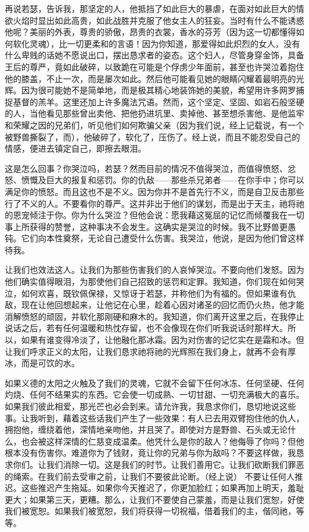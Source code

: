 再说若瑟，告诉我，那坚定的人，他抵挡了如此巨大的暴虐，在面对如此巨大的情欲火焰时显出如此高贵，如此战胜并克服了他女主人的狂妄。当时有什么不能诱惑他呢？美丽的外表，尊贵的骄傲，昂贵的衣裳，香水的芬芳（因为这一切都懂得如何软化灵魂），比一切更柔和的言语！因为你知道，那爱得如此炽烈的女人，没有什么卑贱的话她不愿说出口，摆出恳求者的姿态。这个妇人，尽管身穿金饰，具备王后的尊严，竟如此破碎，以致跪在可能是个俘虏少年面前，甚至也许哭泣着抱住他的膝盖，不止一次，而是屡次如此。然后他可能看见她的眼睛闪耀着最明亮的光辉。因为很可能她不是简单地，而是极其精心地装饰她的美貌，希望用许多网罗捕捉基督的羔羊。这里还加上许多魔法咒语。然而，这个坚定、坚固、如岩石般坚硬的人，当他看见那些曾出卖他、把他扔进坑里、卖掉他、甚至想杀害他、是他监牢和荣耀之因的兄弟们，听见他们如何欺骗父亲（因为我们说，经上记载说，有一个被野兽撕裂了，而），他破碎了，软化了，压伤了。经上说，而且不能忍受自己的情感，便进去镇定自己，即擦去眼泪。\par

这是怎么回事？你哭泣吗，若瑟？然而目前的情况不值得哭泣，而值得愤怒、忿怒、愤慨及巨大的报复和惩罚。你的仇敌——那些杀兄弟者——在你手中；你可以满足你的愤怒。而且这也不是不义。因为你并不是首先行不义，而是自卫反击那些行了不义的人。不要看你的尊严。这并非出于他们的谋划，而是出于天主，祂将祂的恩宠倾注于你。你为什么哭泣？但他会说：愿我藉这冤屈的记忆而倾覆我在一切事上所获得的赞誉，这种事决不会发生。这确实是哭泣的时候。我不比野兽更愚钝。它们向本性奠祭，无论自己遭受什么伤害。我哭泣，他说，是因为他们曾这样待我。\par

让我们也效法这人。让我们为那些伤害我们的人哀悼哭泣。不要向他们发怒。因为他们确实值得眼泪，为那使他们自己招致的惩罚和定罪。我知道，你们现在如何哭泣，如何欢喜，既钦佩保禄，又惊讶于若瑟，并称他们为有福的。但如果谁有仇敌，现在让他回想起来，让他记在心里，趁着心因对诸圣的回忆而仍火热，他才能消解愤怒的顽固，并软化那刚硬和麻木的。我知道，你们离开这里之后，在我停止说话之后，若有任何温暖和热忱存留，也不会像现在你们听我说话时那样大。所以，如果有谁变得冷淡了，让他融化那冰霜。因为对伤害的记忆实在是霜和冰。但让我们呼求正义的太阳，让我们恳求祂将祂的光辉照在我们身上，就再不会有厚冰，而是可饮的水。\par

如果义德的太阳之火触及了我们的灵魂，它就不会留下任何冰冻、任何坚硬、任何灼烧、任何不结果实的东西。它会使一切成熟、一切甘甜、一切充满极大的喜乐。如果我们彼此相爱，那光芒也必会到来。请允许我，我恳求你们，恳切地说这些事。让我听到，藉着这些话我们产生了一些效果：有人已去用双臂抱住他的仇人，拥抱他，缠绕着他，深情地亲吻他，并且哭了。即使对方是野兽、石头或无论什么，也会被这样深情的仁慈变成温柔。他凭什么是你的敌人？他侮辱了你吗？但他根本没有伤害你。难道你为了钱财，竟让你的兄弟与你为敌吗？不要这样做，我恳求你们。让我们消除一切。这是我们的时节。让我们善用它。让我们砍断我们罪恶的绳索。在我们前去受审之前，让我们不要彼此论断。（经上说）  不要让任何人推迟。这些推迟产生拖延。如果你今天推迟了，你更加脸红；如果再加上明天，羞耻更大；如果第三天，更糟。那么，让我们不要使自己蒙羞，而是让我们宽恕，好使我们被宽恕。如果我们被宽恕，我们将获得一切祝福，借着我们的主，偕同祂，等等。\par

